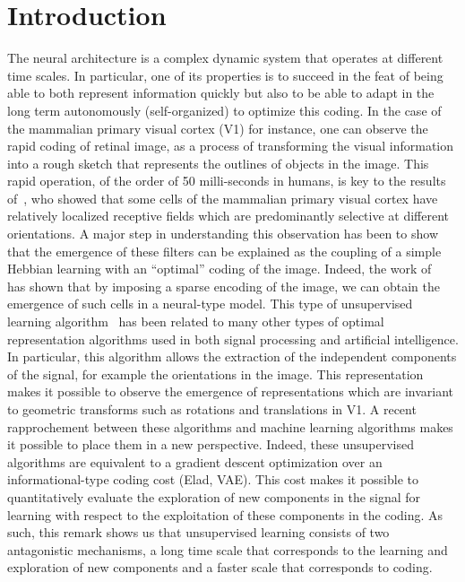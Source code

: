 \documentclass[a4paper, 11pt, draft]{article} %
\title{\Title}
\author{%
\FirstNameA\ \AuthorA \and \FirstNameB\ \AuthorB \and \FirstNameC\ \AuthorC
}
\date{\Institute\ \\ 
\Organism\
}
\newcommand{\Abstract}{
The formation of structure in the brain, that is, of the connection between cells within neural populations, is by large an unsupervised learning process: The emergence of this architecture is mostly self-organized. In the primary visual cortex of mammals, for example, one may observe during development the emergence of cells selective to localized, oriented features. This leads to the development of a rough representation of contours of the retinal image in area V1. A major difficulty in defining unsupervised learning algorithms is that during this process, on the one hand the coding is performed knowing an immature structure and on the other hand, the adaptation of this structure is carried out knowing a code that is not yet optimal. We propose here a fast algorithm compatible with a neuromimetic architecture which solves this problem and allows for the fast emergence of localized filters sensitive to orientation. The key to this algorithm lies in a simple yet optimal mechanism of homeostasis that reconciles the antagonistic processes that occur at the coding and learning time scales. We tested this unsupervised algorithm with this homeostasis rule for a range of existing unsupervised learning algorithms coupled with different neural coding algorithms. In addition, we propose a simplification of this optimal homeostasis rule by implementing a simple heuristic on the probability of activation of neurones. Compared to the optimal homeostasis rule, we show that this heuristic allows to implement an even faster unsupervised learning algorithm while keeping a large part of its effectiveness. These results demonstrate the potential application of such a strategy to the fast classification of images, for example in hierarchical and dynamic architectures.
}
\begin{document}
%
\maketitle
\begin{abstract}
\Abstract
\end{abstract}
\thispagestyle{empty}
\section{Introduction}\label{introduction}
The neural architecture is a complex dynamic system that operates at different time scales. In particular, one of its properties is to succeed in the feat of being able to both represent information quickly but also to be able to adapt in the long term autonomously (self-organized) to optimize this coding. In the case of the mammalian primary visual cortex (V1) for instance, one can observe the rapid coding of retinal image, as a process of transforming the visual information into a rough sketch that represents the outlines of objects in the image. This rapid operation, of the order of 50 milli-seconds in humans, is key to the results of~\citet{hubel1968receptive}, who showed that some cells of the mammalian primary visual cortex have relatively localized receptive fields which are predominantly selective at different orientations. A major step in understanding this observation has been to show that the emergence of these filters can be explained as the coupling of a simple Hebbian learning with an ``optimal'' coding of the image. Indeed, the work of~\citet{olshausen1996emergence} has shown that by imposing a sparse encoding of the image, we can obtain the emergence of such cells in a neural-type model. This type of unsupervised learning algorithm~\citep{Olshausen97} has been related to many other types of optimal representation algorithms used in both signal processing and artificial intelligence. In particular, this algorithm allows the extraction of the independent components of the signal, for example the orientations in the image. This representation makes it possible to observe the emergence of representations which are invariant to geometric transforms such as rotations and translations in V1. A recent rapprochement between these algorithms and machine learning algorithms makes it possible to place them in a new perspective. Indeed, these unsupervised algorithms are equivalent to a gradient descent optimization over an informational-type coding cost (Elad, VAE). This cost makes it possible to quantitatively evaluate the exploration of new components in the signal for learning with respect to the exploitation of these components in the coding. As such, this remark shows us that unsupervised learning consists of two antagonistic mechanisms, a long time scale that corresponds to the learning and exploration of new components and a faster scale that corresponds to coding.
\end{document}
